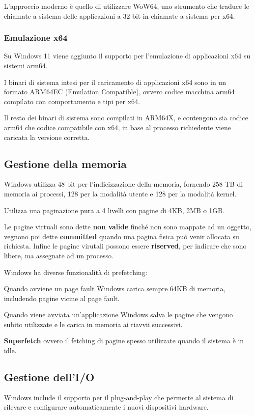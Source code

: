 L'approccio moderno è quello di utilizzare WoW64, uno strumento che traduce le chiamate a sistema delle applicazioni a 32 bit in chiamate a sistema per x64.

\subsubsection{Emulazione x64}
Su Windows 11 viene aggiunto il supporto per l'emulazione di applicazioni x64 su sistemi arm64.

I binari di sistema intesi per il caricamento di applicazioni x64 sono in un formato ARM64EC (Emulation Compatible), ovvero codice macchina arm64 compilato con comportamento e tipi per x64.

Il resto dei binari di sistema sono compilati in ARM64X, e contengono sia codice arm64 che codice compatibile con x64, in base al processo richiedente viene caricata la versione corretta.

\subsection{Gestione della memoria}
Windows utilizza 48 bit per l'indicizzazione della memoria, fornendo 258 TB di memoria ai processi, 128 per la modalità utente e 128 per la modalità kernel.

Utilizza una paginazione pura a 4 livelli con pagine di 4KB, 2MB o 1GB.

\spacer
Le pagine virtuali sono dette \textbf{non valide} finché non sono mappate ad un oggetto, vegnono poi dette \textbf{committed} quando una pagina fisica può venir allocata su richiesta.
Infine le pagine virutali possono essere \textbf{riserved}, per indicare che sono libere, ma assegnate ad un processo.

\spacer
Windows ha diverse funzionalità di prefetching:
\begin{sitemize}
    \item Quando avviene un page fault Windows carica sempre 64KB di memoria, includendo pagine vicine al page fault.
    \item Quando viene avviata un'applicazione Windows salva le pagine che vengono subito utilizzate e le carica in memoria ai riavvii successivi.
    \item \textbf{Superfetch} ovvero il fetching di pagine spesso utilizzate quando il sistema è in idle.
\end{sitemize}

\subsection{Gestione dell'I/O}
Windows include il supporto per il plug-and-play che permette al sistema di rilevare e configurare automaticamente i nuovi dispositivi hardware.

